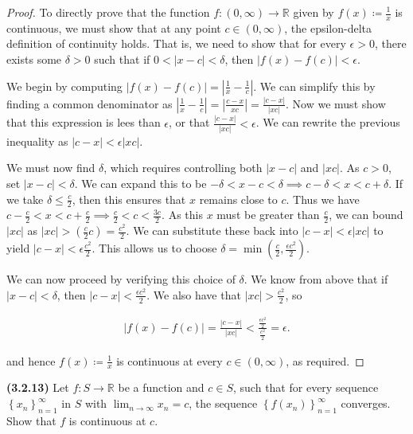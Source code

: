 \documentclass[12pt]{article}
\newcommand{\limtoinf}[1][n]{\displaystyle\lim_{ {#1} \to \infty}}
\newcommand{\abs}[1]{\left| {#1} \right|}
\newcommand{\seq}[2][n]{\left\{ {#2} \right\}_{#1=1}^\infty}
\newcommand{\paren}[1]{\left( {#1} \right)}
\newcommand{\bR}{\mathbb{R}}
\begin{document}
\begin{proof}
	To directly prove that the function $f:\paren{0,\infty}\to\bR$ given by $f(x)\coloneq\frac{1}{x}$ is continuous, we must show that at any point $c\in\paren{0,\infty}$, the epsilon-delta definition of continuity holds. That is, we need to show that for every $\epsilon>0$, there exists some $\delta>0$ such that if $0<\abs{x-c}<\delta$, then $\abs{f(x)-f(c)}<\epsilon$.

\indent We begin by computing $\abs{f(x)-f(c)}=\abs{\frac{1}{x}-\frac{1}{c}}$. We can simplify this by finding a common denominator as $\abs{\frac{1}{x}-\frac{1}{c}}=\abs{\frac{c-x}{xc}}=\frac{\abs{c-x}}{\abs{xc}}$. Now we must show that this expression is lees than $\epsilon$, or that $\frac{\abs{c-x}}{\abs{xc}}<\epsilon$. We can rewrite the previous inequality as $\abs{c-x}<\epsilon\abs{xc}$.

\indent We must now find $\delta$, which requires controlling both $\abs{x-c}$ and $\abs{xc}$. As $c>0$, set $\abs{x-c}<\delta$. We can expand this to be $-\delta<x-c<\delta\implies c-\delta<x<c+\delta$. If we take $\delta\le\frac{c}{2}$, then this ensures that $x$ remains close to $c$. Thus we have $c-\frac{c}{2}<x<c+\frac{c}{2}\implies\frac{c}{2}<c<\frac{3c}{2}$. As this $x$ must be greater than $\frac{c}{2}$, we can bound $\abs{xc}$ as $\abs{xc}>\paren{\frac{c}{2}c}=\frac{c^2}{2}$. We can substitute these back into $\abs{c-x}<\epsilon\abs{xc}$ to yield $\abs{c-x}<\epsilon\frac{c^2}{2}$. This allows us to choose $\delta=\min\paren{\frac{c}{2}, \frac{\epsilon c^2}{2}}$.

\indent We can now proceed by verifying this choice of $\delta$. We know from above that if $\abs{x-c}<\delta$, then $\abs{c-x}<\frac{\epsilon c^2}{2}$. We also have that $\abs{xc}>\frac{c^2}{2}$,  so

\begin{align*}
	\abs{f(x)-f(c)}=\frac{\abs{c-x}}{\abs{xc}}<\frac{\frac{\epsilon c^2}{2}}{\frac{c^2}{2}}=\epsilon. 
\end{align*}

\noindent and hence $f(x)\coloneq\frac{1}{x}$ is continuous at every $c\in\paren{0,\infty}$, as required.
\end{proof}

\newpage

\noindent \textbf{(3.2.13)} Let $f:S\to\bR$ be a function and $c\in S$, such that for every sequence $\seq{x_n}$ in $S$ with $\limtoinf x_n=c$, the sequence $\seq{f(x_n)}$ converges. Show that $f$ is continuous at $c$.
\end{document}
